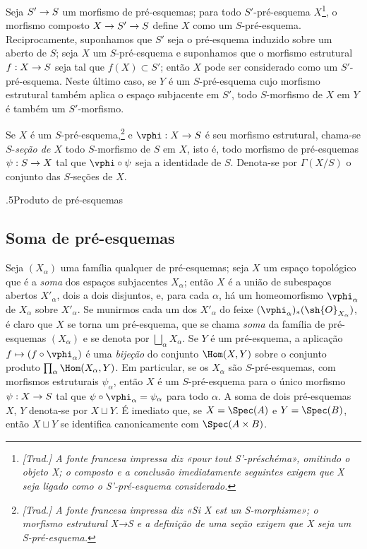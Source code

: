 \documentclass[oneside]{amsart}
\makeatletter
\renewcommand*{\section}{%
  \@startsection{section}{1}{\z@}{.7\linespacing\@plus\linespacing}%
  {.5\linespacing}{\normalfont\bfseries\Large\scshape\centering}}
\newcommand{\ega@arrow}[2]{\mathchoice{#1}{#2}{#2}{#2}}
\let\ega@shortmapsto\mapsto
\renewcommand{\to}{\ega@arrow{\longrightarrow}{\rightarrow}}
\renewcommand{\mapsto}{\ega@arrow{\longmapsto}{\ega@shortmapsto}}
\let\EGAOriginalLabel\label
\renewcommand{\label}[1]{\phantomsection\EGAOriginalLabel{#1}}
\makeatother
\begin{document}
\begin{env}[2.5.4]
\label{I.2.5.4}
Seja $S'\to S$ um morfismo de pré-esquemas; para todo $S'$-pré-esquema
$X$\footnote{\emph{[Trad.] A fonte francesa impressa diz «pour tout
S'-préschéma», omitindo o objeto X; o composto e a conclusão imediatamente
seguintes exigem que X seja ligado como o S'-pré-esquema considerado.}}, o
morfismo composto $X\to S'\to S$ define $X$ como um $S$-pré-esquema.
Reciprocamente, suponhamos que $S'$ seja o pré-esquema induzido sobre um aberto
de $S$; seja $X$ um $S$-pré-esquema e suponhamos que o morfismo estrutural
$f:X\to S$ seja tal que $f(X)\subset S'$; então $X$ pode ser considerado como
um $S'$-pré-esquema. Neste último caso, se $Y$ é um $S$-pré-esquema cujo
morfismo estrutural também aplica o espaço subjacente em $S'$, todo
$S$-morfismo de $X$ em $Y$ é também um $S'$-morfismo.
\end{env}

\begin{env}[2.5.5]
\label{I.2.5.5}
Se $X$ é um $S$-pré-esquema,\footnote{\emph{[Trad.] A fonte francesa impressa
diz «Si X est un S-morphisme»; o morfismo estrutural X→S e a definição de uma
seção exigem que X seja um S-pré-esquema.}} e $\vphi:X\to S$ é seu morfismo
estrutural, chama-se $S$-\emph{seção de $X$} todo $S$-morfismo de $S$ em $X$,
isto é, todo morfismo de pré-esquemas $\psi:S\to X$ tal que $\vphi\circ\psi$
seja a identidade de $S$. Denota-se por $\Gamma(X/S)$ o conjunto das
$S$-seções de $X$.
\end{env}

\section{Produto de pré-esquemas}
\label{section:I.3}

\subsection{Soma de pré-esquemas}
\label{subsection:I.3.1}
\label{I.3.1}

\label{I.3.1.1}
Seja $(X_\alpha)$ uma família qualquer de pré-esquemas; seja $X$ um espaço
topológico que é a \emph{soma} dos espaços subjacentes $X_\alpha$; então $X$
é a união de subespaços abertos $X'_\alpha$, dois a dois disjuntos, e, para
cada $\alpha$, há um homeomorfismo $\vphi_\alpha$ de $X_\alpha$ sobre
$X'_\alpha$. Se munirmos cada um dos $X'_\alpha$ do feixe
$(\vphi_\alpha)_*(\sh{O}_{X_\alpha})$, é claro que $X$ se torna um
pré-esquema, que se chama \emph{soma} da família de pré-esquemas $(X_\alpha)$
e se denota por $\bigsqcup_\alpha X_\alpha$. Se $Y$ é um pré-esquema, a
aplicação $f\mapsto(f\circ\vphi_\alpha)$ é uma \emph{bijeção} do conjunto
$\Hom(X,Y)$ sobre o conjunto produto $\prod_\alpha\Hom(X_\alpha,Y)$. Em
particular, se os $X_\alpha$ são $S$-pré-esquemas, com morfismos estruturais
$\psi_\alpha$, então $X$ é um $S$-pré-esquema para o único morfismo
$\psi:X\to S$ tal que $\psi\circ\vphi_\alpha=\psi_\alpha$ para todo
$\alpha$. A soma de dois pré-esquemas $X$, $Y$ denota-se por $X\sqcup Y$.
É imediato que, se $X=\Spec(A)$ e $Y=\Spec(B)$, então $X\sqcup Y$ se
identifica canonicamente com $\Spec(A\times B)$.
\end{document}
